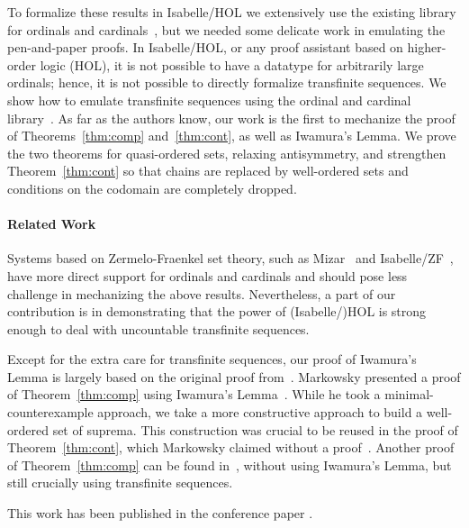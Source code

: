 \documentclass[11pt,a4paper]{article}
\begin{document}
To formalize these results in Isabelle/HOL
we extensively use the existing library for ordinals and cardinals~\cite{CardIsa},  but we needed some delicate work in emulating the pen-and-paper proofs.
In Isabelle/HOL, or any proof assistant based on higher-order logic (HOL), it is not possible to have a datatype for arbitrarily large ordinals;
hence, it is not possible to directly formalize transfinite sequences.
We show how to emulate transfinite sequences using the ordinal and cardinal library~\cite{CardIsa}.
As far as the authors know, our work is the first to mechanize the proof of Theorems~\ref{thm:comp} and~\ref{thm:cont}, as well as Iwamura's Lemma.
We prove the two theorems for quasi-ordered sets, relaxing antisymmetry, and strengthen Theorem~\ref{thm:cont} so that chains are replaced by well-ordered sets and conditions on the codomain are completely dropped.

\paragraph*{Related Work}
Systems based on Zermelo-Fraenkel set theory, such as Mizar~\cite{MizerOrdinal} and Isabelle/ZF~\cite{PaulsonG96}, have more direct support for ordinals and cardinals and should pose less challenge in mechanizing the above results.
Nevertheless, a part of our contribution is in demonstrating that the power of (Isabelle/)HOL is strong enough to deal with uncountable transfinite sequences.

Except for the extra care for transfinite sequences, 
our proof of Iwamura's Lemma is largely based on the original proof from~\cite{iwamura}.
Markowsky presented a proof of Theorem~\ref{thm:comp} using Iwamura's Lemma~\cite[Corollary 1]{markowsky76}.
While he took a minimal-counterexample approach, we take a more constructive approach to build a well-ordered set of suprema.
This construction was crucial to be reused in the proof of Theorem~\ref{thm:cont}, which Markowsky claimed without a proof~\cite{markowsky76}.
Another proof of Theorem~\ref{thm:comp} can be found in~\cite{Cohn65}, without using Iwamura's Lemma, but 
still crucially using transfinite sequences.

This work has been 
published in the conference paper \cite{yamada23}.





\end{document}
